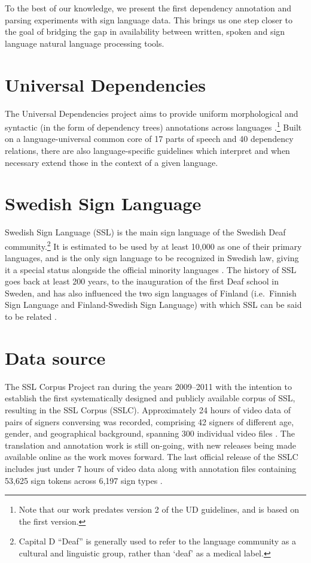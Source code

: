 \documentclass[11pt]{article}
\begin{document}
To the best of our knowledge, we present the first dependency annotation and
parsing experiments with sign language data. This brings us one step closer to
the goal of bridging the gap in availability between written, spoken and sign
language natural language processing tools.

\section{Universal Dependencies}

The Universal Dependencies project aims to provide uniform morphological and
syntactic (in the form of dependency trees) annotations across languages
\cite{Nivre2016ud}.\footnote{Note that our work predates version 2 of the UD
guidelines, and is based on the first version.}
Built on a language-universal common core of 17 parts of speech and
40 dependency relations, there are also language-specific guidelines which
interpret and when necessary extend those in the context of a given language.

\section{Swedish Sign Language}

Swedish Sign Language (SSL) is the main sign language of the Swedish Deaf community.\footnote{Capital D ``Deaf'' is generally used to refer to the language community as a cultural and linguistic group, rather than `deaf' as a medical label.} It is estimated to be used by at least 10,000 as one of their primary languages, and is the only sign language to be recognized in Swedish law, giving it a special status alongside the official minority languages \cite{Ahlgren2006sou,Parkvall2015siffror}. The history of SSL goes back at least 200 years, to the inauguration of the first Deaf school in Sweden, and has also influenced the two sign languages of Finland (i.e.~Finnish Sign Language and Finland-Swedish Sign Language) with which SSL can be said to be related \cite{Bergman2010transmission}.

\section{Data source}

The SSL Corpus Project ran during the years 2009--2011 with the intention to establish the first systematically designed and publicly available corpus of SSL, resulting in the SSL Corpus (SSLC). Approximately 24 hours of video data of pairs of signers conversing was recorded, comprising 42 signers of different age, gender, and geographical background, spanning 300 individual video files \cite{Mesch2012signed}. The translation and annotation work is still on-going, with new releases being made available online as the work moves forward. The last official release of the SSLC includes just under 7 hours of video data \cite{Mesch2012dataset} along with annotation files containing 53,625 sign tokens across 6,197 sign types \cite{Mesch2016annotated}. 
\end{document}
